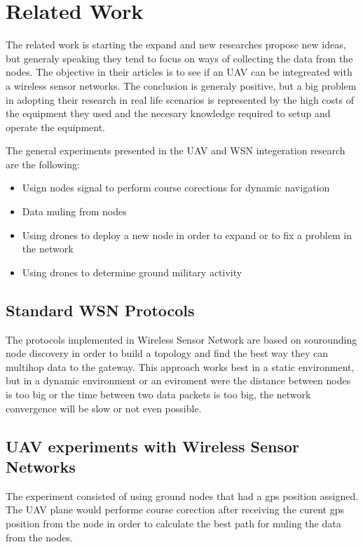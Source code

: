 \normalfont\normalsize
\chapter{Related Work}

The related work is starting the expand and new researches propose new ideas, but generaly speaking they tend to focus on ways of collecting the data from the nodes. The objective in their articles is to see if an UAV can be integreated with a wireless sensor networks. The conclusion is generaly positive, but a big problem in adopting their research in real life scenarios is represented by the high costs of the equipment they used and the necesary knowledge required to setup and operate the equipment.

The general experiments presented in the UAV and WSN integeration research are the following:

\begin{itemize}

\item Usign nodes signal to perform course corections for dynamic navigation
\item Data muling from nodes 
\item Using drones to deploy a new node in order to expand or to fix a problem in the network
\item Using drones to determine ground military activity \cite{akyildiz2002wireless}

\end{itemize}


\section{Standard WSN Protocols}

The protocols implemented in Wireless Sensor Network are based on sourounding node discovery in order to build a topology and find the best way they can multihop data to the gateway. This approach works best in a static environment, but in a dynamic environment or an eviroment were the distance between nodes is too big or the time between two data packets is too big, the network convergence will be slow or not even possible.

\section{UAV experiments with Wireless Sensor Networks} \cite{teh2008experiments} 

The experiment consisted of using ground nodes that had a gps position assigned. The UAV plane would performe course corection after receiving the curent gps position from the node in order to calculate the best path for muling the data from the nodes.


